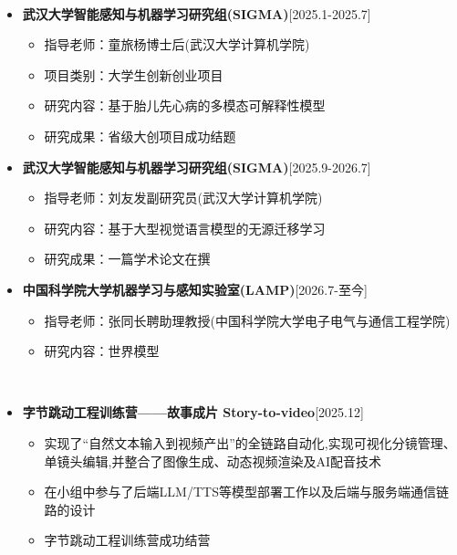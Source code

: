 \documentclass[10pt,article]{article}
\newcommand{\resheading}[1]{{\small \colorbox{mygrey} { \begin{minipage}{0.99\textwidth}\centering{\textbf{#1 \vphantom{p\^{E}}}}\end{minipage}}}}
\begin{document}
	
	\noindent
	\resheading{\textbf{科研经历}}\\[-0.45cm]
	\begin{itemize}
		\setlength\itemsep{-0.2em}
		
		\item \textbf{武汉大学智能感知与机器学习研究组(SIGMA)}\hfill {[2025.1-2025.7]}
		\begin{itemize}[noitemsep,nolistsep]
			\item 指导老师：童旅杨博士后(武汉大学计算机学院)
			\item 项目类别：大学生创新创业项目
			\item 研究内容：基于胎儿先心病的多模态可解释性模型
			\item 研究成果：省级大创项目成功结题
		\end{itemize}
		
		\item \textbf{武汉大学智能感知与机器学习研究组(SIGMA)}\hfill {[2025.9-2026.7]} 
		\begin{itemize}[noitemsep,nolistsep]
			\item 指导老师：刘友发副研究员(武汉大学计算机学院)
			\item 研究内容：基于大型视觉语言模型的无源迁移学习
			\item 研究成果：一篇学术论文在撰
		\end{itemize}
        \item \textbf{中国科学院大学机器学习与感知实验室(LAMP)}\hfill {[2026.7-至今]} 
		\begin{itemize}[noitemsep,nolistsep]
			\item 指导老师：张同长聘助理教授(中国科学院大学电子电气与通信工程学院)
			\item 研究内容：世界模型
		\end{itemize}
		
	\end{itemize}
	\noindent
	\resheading{\textbf{项目经历}}\\[-0.45cm]
	\begin{itemize}
		\setlength\itemsep{-0.2em}
	
		
		\item \textbf{字节跳动工程训练营——故事成片 Story-to-video}\hfill {[2025.12]} 
		\begin{itemize}[noitemsep,nolistsep]
			\item 实现了“自然文本输入到视频产出”的全链路自动化,实现可视化分镜管理、单镜头编辑,并整合了图像生成、动态视频渲染及AI配音技术
			\item 在小组中参与了后端LLM/TTS等模型部署工作以及后端与服务端通信链路的设计
			\item 字节跳动工程训练营成功结营
		\end{itemize}
		
	\end{itemize}
	
\end{document}
